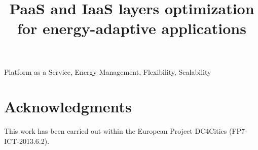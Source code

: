 \documentclass[10pt, conference, compsocconf]{IEEEtran}
\begin{document}
\title{PaaS and IaaS layers optimization for energy-adaptive applications}

\author{
}

\maketitle
\begin{abstract}

\end{abstract}

\begin{IEEEkeywords}
Platform as a Service, Energy Management, Flexibility, Scalability
\end{IEEEkeywords}








\section*{Acknowledgments}

This work has been carried out within the European Project DC4Cities (FP7-ICT-2013.6.2).



\end{document}
